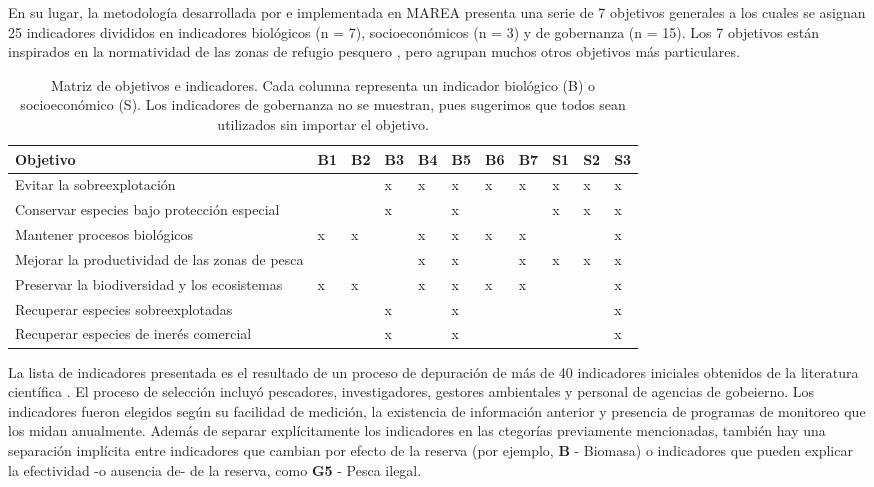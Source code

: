 \documentclass[]{krantz}
\begin{document}
En su lugar, la metodología desarrollada por
\citet{villasenorderbez_2018} e implementada en MAREA presenta una serie
de 7 objetivos generales a los cuales se asignan 25 indicadores
divididos en indicadores biológicos (n = 7), socioeconómicos (n = 3) y
de gobernanza (n = 15). Los 7 objetivos están inspirados en la
normatividad de las zonas de refugio pesquero \citep{nom}, pero agrupan
muchos otros objetivos más particulares.

\begin{table}

\caption{\label{tab:tabla-oi}Matriz de objetivos e indicadores. Cada columna representa un indicador biológico (B) o socioeconómico (S). Los indicadores de gobernanza no se muestran, pues sugerimos que todos sean utilizados sin importar el objetivo.}
\centering
\begin{tabular}[t]{lllllllllll}
\toprule
Objetivo & B1 & B2 & B3 & B4 & B5 & B6 & B7 & S1 & S2 & S3\\
\midrule
Evitar la sobreexplotación &  &  & x & x & x & x & x & x & x & x\\
Conservar especies bajo protección especial &  &  & x &  & x &  &  & x & x & x\\
Mantener procesos biológicos & x & x &  & x & x & x & x &  &  & x\\
Mejorar la productividad de las zonas de pesca &  &  &  & x & x &  & x & x & x & x\\
Preservar la biodiversidad y los ecosistemas & x & x &  & x & x & x & x &  &  & x\\
\addlinespace
Recuperar especies sobreexplotadas &  &  & x &  & x &  &  &  &  & x\\
Recuperar especies de inerés comercial &  &  & x &  & x &  &  &  &  & x\\
\bottomrule
\end{tabular}
\end{table}

La lista de indicadores presentada es el resultado de un proceso de
depuración de más de 40 indicadores iniciales obtenidos de la literatura
científica
\citetext{\citealp[\citet{lester_2009}]{halpern_2002}; \citealp{lester_2008}; \citealp{micheli_2012}; \citealp{halpern_2013}; \citealp{basurto_2013}; \citealp{leslie_2015}}.
El proceso de selección incluyó pescadores, investigadores, gestores
ambientales y personal de agencias de gobeierno. Los indicadores fueron
elegidos según su facilidad de medición, la existencia de información
anterior y presencia de programas de monitoreo que los midan anualmente.
Además de separar explícitamente los indicadores en las ctegorías
previamente mencionadas, también hay una separación implícita entre
indicadores que cambian por efecto de la reserva (por ejemplo,
\textbf{B} - Biomasa) o indicadores que pueden explicar la efectividad
-o ausencia de- de la reserva, como \textbf{G5} - Pesca ilegal.
\end{document}
